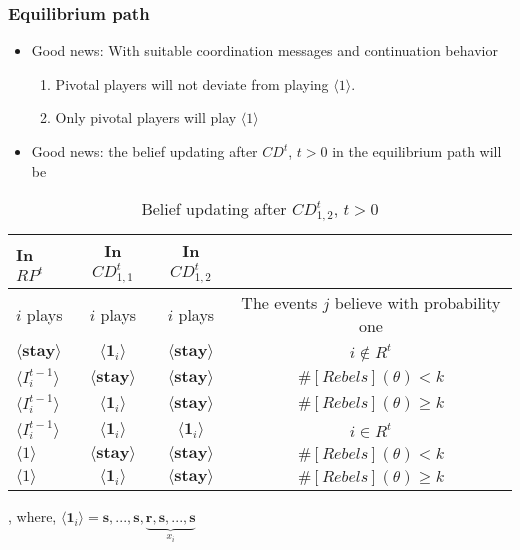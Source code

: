 \documentclass[10pt]{beamer}
\begin{document}
\begin{frame}
\frametitle{Equilibrium path}

\begin{itemize}
\item Good news: With suitable coordination messages and continuation behavior
\begin{enumerate}
\item Pivotal players will not deviate from playing $\langle 1 \rangle$.
\item Only pivotal players will play $\langle 1 \rangle$
\end{enumerate}
\item Good news: the belief updating after $CD^t$, $t>0$ in the equilibrium path will be

\end{itemize}


\begin{table}[ht]
\caption{Belief updating after $CD^t_{1,2}$, $t>0$}
\label{Table_blf_up_cdt12}
\begin{center}
\begin{tabular}{l c c c}
In $RP^t$ 	 	&  	In $CD^t_{1,1}$		&  In $CD^t_{1,2}$	  &\\
\hline
\hline
$i$ plays 		                             &  	$i$ plays		&				$i$ plays			& The events $j$ believe with probability one  \\
\hline
$\langle  \textbf{stay} \rangle$ 	& 	$\langle \mathbf{1}_i \rangle$	&  $\langle \textbf{stay} \rangle$ &  $i\notin R^t$ \\
$\langle  {I^{t-1}_i} \rangle$ 		&  $\langle \textbf{stay} \rangle$	&	$\langle \textbf{stay} \rangle$ &  $\#[Rebels](\theta)< k$   \\
$\langle  {I^{t-1}_i} \rangle$ 		&  $\langle \mathbf{1}_i \rangle$	&	$\langle \textbf{stay} \rangle$ &  $\#[Rebels](\theta)\geq k$    \\
$\langle  {I^{t-1}_i} \rangle$ 		&  $\langle \mathbf{1}_i \rangle$	&	$\langle \mathbf{1}_i \rangle$ &  $i\in R^t$  \\
$\langle 1 \rangle$ 		             &  $\langle \textbf{stay} \rangle$	&	$\langle \textbf{stay} \rangle$ &  $\#[Rebels](\theta)< k$\\
$\langle 1 \rangle$ 		             &  $\langle \mathbf{1}_i \rangle$	&	$\langle \textbf{stay} \rangle$ & $\#[Rebels](\theta)\geq k$
\end{tabular}
\end{center}
\end{table}
, where, $\langle \mathbf{1}_i \rangle=\textbf{s},...,\textbf{s},\underbrace{\textbf{r},\textbf{s},...,\textbf{s}}_{x_i}$
\end{frame}
\end{document}
